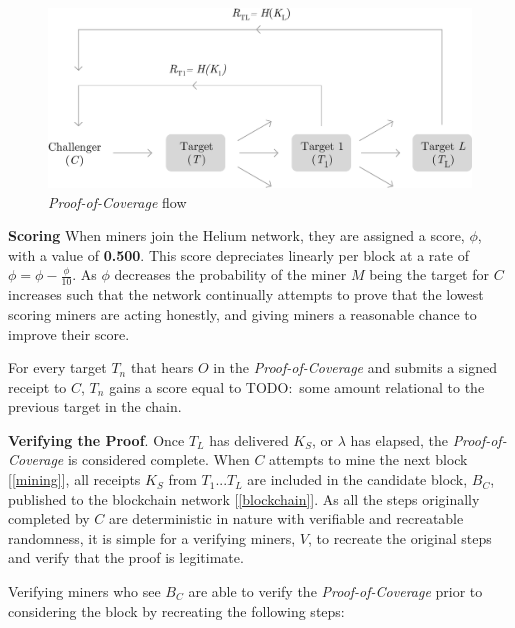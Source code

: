 \documentclass[letterpaper,11pt]{article}
\newcommand{\todo}[1]{}
\renewcommand{\todo}[1]{{\color{red} TODO:\ {#1}}}
\begin{document}
\begin{figure}[H]
    \begin{center}
          \includegraphics[width=\textwidth]{diagram4.eps}
          \caption{\emph{Proof-of-Coverage} flow}
          \label{fig:poc-flow}
     \end{center}
\end{figure}

\textbf{Scoring} \label{scores} When miners join the Helium network, they are assigned a score, $\phi$, with a value of \textbf{0.500}. This score depreciates linearly per block at a rate of $\phi = \phi - \frac{\phi}{10}$. As $\phi$ decreases the probability of the miner $M$ being the target for $C$ increases such that the network continually attempts to prove that the lowest scoring miners are acting honestly, and giving miners a reasonable chance to improve their score.

For every target $T_n$ that hears $O$ in the \emph{Proof-of-Coverage} and submits a signed receipt to $C$, $T_n$ gains a score equal to \todo{some amount relational to the previous target in the chain}.

\textbf{Verifying the Proof}. Once $T_L$ has delivered $K_S$, or $\lambda$ has elapsed, the \emph{Proof-of-Coverage} is considered complete. When $C$ attempts to mine the next block [\ref{mining}], all receipts $K_S$ from $T_1$...$T_L$ are included in the candidate block, $B_C$, published to the blockchain network [\ref{blockchain}]. As all the steps originally completed by $C$ are deterministic in nature with verifiable and recreatable randomness, it is simple for a verifying miners, $V$, to recreate the original steps and verify that the proof is legitimate.

Verifying miners who see $B_C$ are able to verify the \emph{Proof-of-Coverage} prior to considering the block by recreating the following steps:
\end{document}
